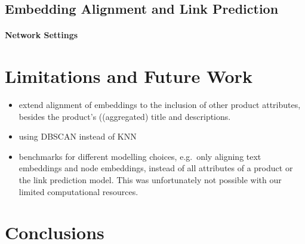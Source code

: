 \documentclass[a4paper]{article} %
\begin{document}
\subsection{Embedding Alignment and Link Prediction}

\paragraph{Network Settings}


\section{Limitations and Future Work}

\begin{itemize}
    \item extend alignment of embeddings to the inclusion of other product attributes, besides the product's ((aggregated) title and descriptions. 
    \item using DBSCAN instead of KNN
    \item benchmarks for different modelling choices, e.g.\ only aligning text embeddings and node embeddings, instead of all attributes of a product or the link prediction model. This was unfortunately not possible with our limited computational resources.
\end{itemize}


\section{Conclusions}


\newpage
 


\newpage
\appendix 
\end{document}
